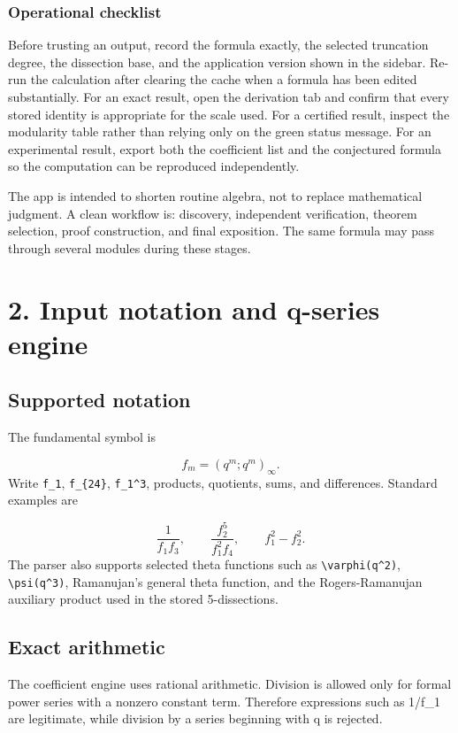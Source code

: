 \documentclass[11pt]{article}
\begin{document}
\subsubsection*{Operational checklist}
Before trusting an output, record the formula exactly, the selected truncation degree, the dissection base, and the application version shown in the sidebar. Re-run the calculation after clearing the cache when a formula has been edited substantially. For an exact result, open the derivation tab and confirm that every stored identity is appropriate for the scale used. For a certified result, inspect the modularity table rather than relying only on the green status message. For an experimental result, export both the coefficient list and the conjectured formula so the computation can be reproduced independently.

The app is intended to shorten routine algebra, not to replace mathematical judgment. A clean workflow is: discovery, independent verification, theorem selection, proof construction, and final exposition. The same formula may pass through several modules during these stages.

\newpage
\section{2. Input notation and q-series engine}
\subsection*{Supported notation}
The fundamental symbol is

\[
f_m=(q^m;q^m)_\infty.
\]
Write \texttt{f\_1}, \texttt{f\_\{24\}}, \texttt{f\_1\textasciicircum{}3}, products, quotients, sums, and differences. Standard examples are

\[
\frac{1}{f_1f_3},\qquad \frac{f_2^5}{f_1^2f_4},\qquad f_1^2-f_2^2.
\]
The parser also supports selected theta functions such as \texttt{\textbackslash{}varphi(q\textasciicircum{}2)}, \texttt{\textbackslash{}psi(q\textasciicircum{}3)}, Ramanujan's general theta function, and the Rogers-Ramanujan auxiliary product used in the stored 5-dissections.

\subsection*{Exact arithmetic}
The coefficient engine uses rational arithmetic. Division is allowed only for formal power series with a nonzero constant term. Therefore expressions such as 1/f\_1 are legitimate, while division by a series beginning with q is rejected.
\end{document}
